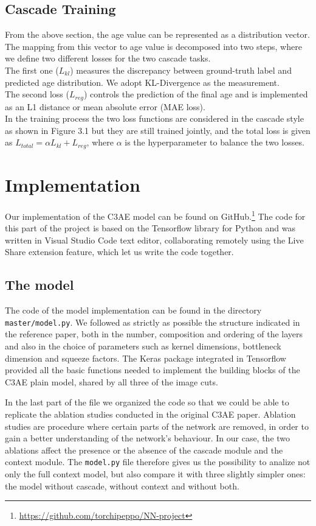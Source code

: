 \subsection*{Cascade Training}
From the above section, the age value can be represented as a distribution vector. The mapping from this 
vector to age value is decomposed into two steps, where we define two different losses for the two cascade 
tasks.\\
The first one ($L_{kl}$) measures the discrepancy between ground-truth label and predicted age distribution.
We adopt KL-Divergence as the measurement.\\
The second loss ($L_{reg}$) controls the prediction of the final age and is implemented as an L1 distance
or mean absolute error (MAE loss).\\
In the training process the two loss functions are considered in the cascade style as shown in Figure 3.1 
but they are still trained jointly, and the total loss is given as
$L_{total} = \alpha L_{kl} + L_{reg}$, where $\alpha$ is the hyperparameter to balance the two losses.

\section{Implementation}
Our implementation of the C3AE model can be found on
GitHub.\footnote{\url{https://github.com/torchipeppo/NN-project}}
The code for this part of the project is based on the Tensorflow library for Python and was written in 
Visual Studio Code text editor, collaborating remotely using the Live Share extension feature, which let 
us write the code together.
\subsection*{The model}
The code of the model implementation can be found in the directory \texttt{master/model.py}. We followed 
as strictly as possible the structure indicated in the reference paper, both in the number, composition 
and ordering of the layers and also in the choice of parameters such as kernel dimensions, bottleneck
dimension and squeeze factors.
The Keras package integrated in Tensorflow provided all the basic functions needed to implement the
building blocks of the C3AE plain model, shared by all three of the image cuts.


In the last part of the file we organized the code so that we could be able to replicate the ablation
studies conducted in the original C3AE paper. Ablation studies are procedure where certain parts of the 
network are removed, in order to gain a better understanding of the network’s behaviour. In our case, 
the two ablations affect the presence or the absence of the cascade module and the context module.
The \texttt{model.py} file therefore gives us the possibility to analize not only the full context 
model, but also compare it with three slightly simpler ones: the model without cascade, without context 
and without both.

